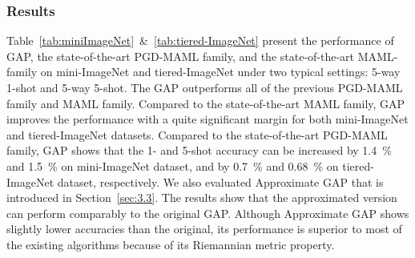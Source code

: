 \subsubsection{Results}
Table~\ref{tab:miniImageNet}~\&~\ref{tab:tiered-ImageNet} present the performance of GAP, the state-of-the-art PGD-MAML family, and the state-of-the-art MAML-family on mini-ImageNet and tiered-ImageNet under two typical settings: 5-way 1-shot and 5-way 5-shot. 
The GAP outperforms all of the previous PGD-MAML family and MAML family. 
Compared to the state-of-the-art MAML family, GAP improves the performance with a quite significant margin for both mini-ImageNet and tiered-ImageNet datasets.
Compared to the state-of-the-art PGD-MAML family, GAP shows that the 1- and 5-shot accuracy can be increased by 1.4~\% and 1.5~\% on mini-ImageNet dataset, and by 0.7~\% and 0.68~\% on tiered-ImageNet dataset, respectively. 
We also evaluated Approximate GAP that is introduced in Section~\ref{sec:3.3}. 
The results show that the approximated version can perform comparably to the original GAP. 
Although Approximate GAP shows slightly lower accuracies than the original,  its performance is superior to most of the existing algorithms because of its Riemannian metric property.

